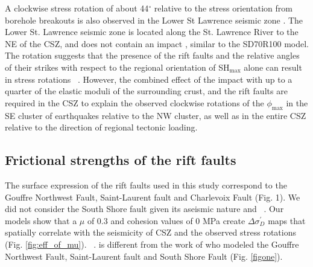 \documentclass[draft]{agujournal2018}
\begin{document}
A clockwise stress rotation of about 44$^\circ$ relative to the stress orientation from borehole breakouts is also observed in the Lower St Lawrence seismic zone \citep{Mazzotti_2010}. The Lower St. Lawrence seismic zone is located along the St. Lawrence River to the NE of the CSZ, and does not contain an impact , similar to the SD70R100 model. The rotation suggests that the presence of the rift faults and the relative angles of their strikes with respect to the regional orientation of SH$_{\max}$ alone can result in stress rotations ~\citep[e.g.,][]{Zoback_1992}. However, the combined effect of the impact  with up to a quarter of the elastic moduli of the surrounding crust, and the rift faults are required in the CSZ to explain the observed clockwise rotations of the $\phi_{\max}$ in the SE cluster of earthquakes relative to the NW cluster, as well as in the entire CSZ relative to the direction of regional tectonic loading.


\subsection{Frictional strengths of the rift faults}
The surface expression of the rift faults used in this study correspond to the Gouffre Northwest Fault, Saint-Laurent fault and Charlevoix Fault (Fig. 1). We did not consider the South Shore fault given its aseismic nature and ~\citep{lamontagne1999}. Our models show that a $\mu$ of 0.3 and cohesion values of 0 MPa create $\Delta\sigma_{D}^\prime$ maps that spatially correlate with the seismicity of CSZ and the observed stress rotations (Fig. \ref{fig:eff_of_mu}).   ~\citep[e.g.,][]{Stevens1980}.  is different from the work of \citet{Baird_2010} who modeled the Gouffre Northwest Fault, Saint-Laurent fault and South Shore Fault (Fig. \ref{figone}). 
\end{document}
